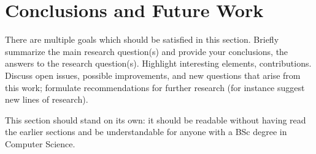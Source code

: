 \section{Conclusions and Future Work}
There are multiple goals which should be satisfied in this section. Briefly summarize the main research question(s) and provide your conclusions, the answers to the research question(s). Highlight interesting elements, contributions. Discuss open issues, possible improvements, and new questions that arise from this work; formulate recommendations for further research (for instance suggest new lines of research).

This section should stand on its own: it should be readable without having read the earlier sections and be understandable for anyone with a BSc degree in Computer Science.
